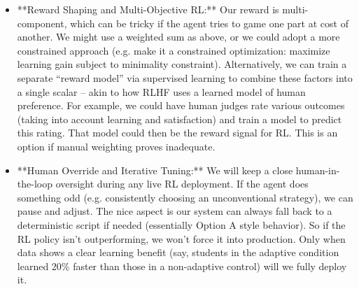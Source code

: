 \documentclass[11pt]{article}
\begin{document}
\begin{itemize}
  \item **Reward Shaping and Multi-Objective RL:** Our reward is multi-component, which can be tricky if the agent tries to game one part at cost of another. We might use a weighted sum as above, or we could adopt a more constrained approach (e.g. make it a constrained optimization: maximize learning gain subject to minimality constraint). Alternatively, we can train a separate “reward model” via supervised learning to combine these factors into a single scalar – akin to how RLHF uses a learned model of human preference. For example, we could have human judges rate various outcomes (taking into account learning and satisfaction) and train a model to predict this rating. That model could then be the reward signal for RL. This is an option if manual weighting proves inadequate.
  \item **Human Override and Iterative Tuning:** We will keep a close human-in-the-loop oversight during any live RL deployment. If the agent does something odd (e.g. consistently choosing an unconventional strategy), we can pause and adjust. The nice aspect is our system can always fall back to a deterministic script if needed (essentially Option A style behavior). So if the RL policy isn’t outperforming, we won’t force it into production. Only when data shows a clear learning benefit (say, students in the adaptive condition learned 20\% faster than those in a non-adaptive control) will we fully deploy it.
\end{itemize}
\end{document}
